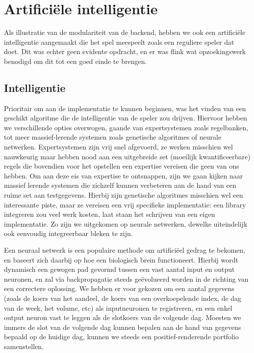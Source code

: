 %
%

\chapter{Artifici\"ele intelligentie}

Als illustratie van de modulariteit van de backend, hebben we ook een artifici\"ele intelligentie aangemaakt die het spel meespeelt zoals een reguliere speler dat doet. Dit was echter geen evidente opdracht, en er was flink wat opzoekingswerk benodigd om dit tot een goed einde te brengen.


\section{Intelligentie}

Prioritair om aan de implementatie te kunnen beginnen, was het vinden van een geschikt algoritme die de intelligentie van de speler zou drijven. Hiervoor hebben we verschillende opties overwogen, gaande van expertsystemen zoals regelbanken, tot meer massief-lerende systemen zoals genetische algoritmes of neurale netwerken. Expertsystemen zijn vrij snel afgevoerd, ze werken misschien wel nauwkeurig maar hebben nood aan een uitgebreide set (moeilijk kwantificeerbare) regels die bovendien voor het opstellen een expertise vereisen die geen van ons hebben. Om aan deze eis van expertise te ontsnappen, zijn we gaan kijken naar massief lerende systemen die zichzelf kunnen verbeteren aan de hand van een ruime set aan testgegevens. Hierbij zijn genetische algoritmes misschien wel een interessante piste, maar ze vereisen een vrij specifieke implementatie: een library integreren zou veel werk kosten, laat staan het schrijven van een eigen implementatie. Zo zijn we uitgekomen op neurale netwerken, dewelke uiteindelijk ook eenvoudig integreerbaar bleken te zijn.

Een neuraal netwerk is een populaire methode om artifici\"eel gedrag te bekomen, en baseert zich daarbij op hoe een biologisch brein functioneert. Hierbij wordt dynamisch een gewogen pad gevormd tussen een vast aantal input en output neuronen, en zal via backpropagatie steeds ge\"evolueerd worden in de richting van een correctere oplossing. We hebben er voor gekozen om een aantal gegevens (zoals de koers van het aandeel, de koers van een overkoepelende index, de dag van de week, het volume, etc) als inputneuronen te registreren, en een enkel output neuron vast te leggen als de slotkoers van de volgende dag. Moesten we immers de slot van de volgende dag kunnen bepalen aan de hand van gegevens bepaald op de huidige dag, kunnen we steeds een positief-renderende portfolio samenstellen.

